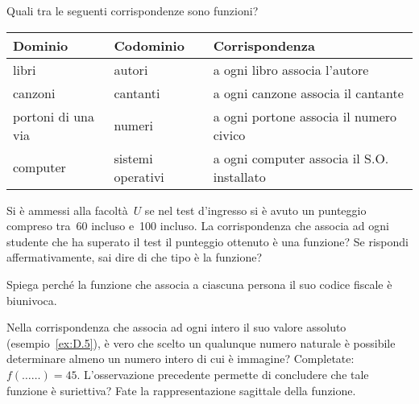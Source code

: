 \begin{esercizio}
 \label{ese:D.4}
Quali tra le seguenti corrispondenze sono funzioni?
\begin{center}
 \begin{tabular}{*3{l}}
 \toprule
  Dominio & Codominio & Corrispondenza\\
\midrule
libri & autori & a ogni libro associa l'autore\\
canzoni & cantanti & a ogni canzone associa il cantante\\
portoni di una via & numeri & a ogni portone associa il numero civico\\
computer & sistemi operativi & a ogni computer associa il S.O. installato\\
\bottomrule
 \end{tabular}
\end{center}
\end{esercizio}

\begin{esercizio}
 \label{ese:D.5}
Si è ammessi alla facoltà~$U$ se nel test
d'ingresso si è avuto un punteggio compreso tra~60
incluso e~100 incluso. La corrispondenza che associa ad ogni studente
che ha superato il test il punteggio ottenuto è una funzione? Se rispondi
affermativamente, sai dire di che tipo è la funzione?
\end{esercizio}


\begin{esercizio}
 \label{ese:D.6}
Spiega perché la funzione che associa a ciascuna
persona il suo codice fiscale è biunivoca.
\end{esercizio}


\begin{esercizio}
 \label{ese:D.7}
Nella corrispondenza che associa ad ogni intero il suo valore assoluto 
(esempio~\ref{ex:D.5}), è vero che scelto un qualunque numero naturale è
possibile determinare almeno un numero intero di cui è immagine?
Completate:~$f({\ldots}{\ldots}) = 45.$
L'osservazione precedente permette di concludere che
tale funzione è suriettiva?
Fate la rappresentazione sagittale della funzione.
\end{esercizio}

